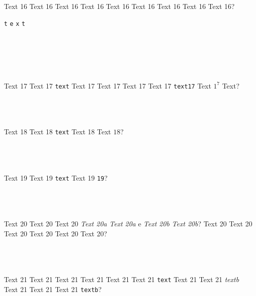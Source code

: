 \documentclass[9pt]{exam}
\begin{document}
\begin{questions}
\question
    Text 16 Text 16 Text 16 Text 16 Text 16 Text 16 Text 16
    Text 16 Text 16?\\
    \begin{oneparchoices}
     \choice \texttt{t}
     \choice \texttt{e}
     \choice \texttt{x}
     \choice \texttt{t}
    \end{oneparchoices}\\\\
    \\\\
    \makebox[0.9\textwidth]{\enspace\hrulefill{}}

\question
    Text 17 Text 17 \texttt{text} Text 17 Text 17 Text 17
    Text 17 \texttt{text17} Text $1^7$ Text?\\\\
    \makebox[0.9\textwidth]{\$ \enspace\hrulefill}\\\\
    \makebox[0.9\textwidth]{\enspace\hrulefill}

\question
    Text 18 Text 18 \texttt{text} Text 18 Text $18$?\\\\
    \makebox[0.9\textwidth]{\$ \enspace\hrulefill}\\\\
    \makebox[0.9\textwidth]{\enspace\hrulefill}

\question
    Text 19 Text 19 \texttt{text} Text 19 \texttt{19}?\\\\
    \makebox[0.9\textwidth]{\$ \enspace\hrulefill}\\\\
    \makebox[0.9\textwidth]{\enspace\hrulefill}

\question
    Text 20 Text 20 Text 20 \emph{Text 20a Text 20a} e
    \emph{Text 20b Text 20b}? Text 20 Text 20 Text 20
    Text 20 Text 20 Text 20?\\\\
    \makebox[0.9\textwidth]{\$ \enspace\hrulefill}\\\\
    \makebox[0.9\textwidth]{\enspace\hrulefill}

\question
    Text 21 Text 21 Text 21 Text 21 Text 21 Text 21 \texttt{text}
    Text 21 Text 21 \emph{textb} Text 21 Text 21 Text 21 \texttt{textb}?\\\\
    \makebox[0.9\textwidth]{\$ \enspace\hrulefill}\\\\
    \makebox[0.9\textwidth]{\enspace\hrulefill}


\end{questions}
\end{document}
